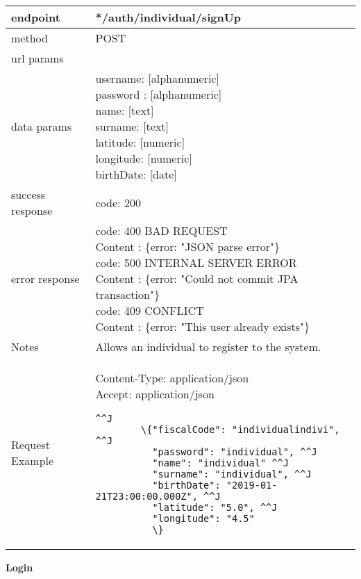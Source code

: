 \begin{tabularx}{\linewidth}{| l| l }
	\hline
	endpoint & */auth/individual/signUp \\
	\hline
	method & POST \\
	\hline
	url params & \\
	\hline
	data params &
	\parbox{0.7\textwidth}{
		\bigskip
		username: [alphanumeric]\\
		password : [alphanumeric]\\
		name: [text]\\
		surname: [text]\\
		latitude: [numeric]\\
		longitude: [numeric]\\
		birthDate: [date]
		\bigskip
	} \\
	\hline
	success response &
	\parbox{0.7\textwidth}{
		\bigskip
		code: 200\\
	} \\
	\hline
	error response &
	\parbox{0.7\textwidth}{
		\bigskip
		code: 400 BAD REQUEST \\
		Content : \{error: "JSON parse error"\}\\
		code: 500 INTERNAL SERVER ERROR \\
		Content : \{error: "Could not commit JPA transaction"\}\\
		code: 409 CONFLICT \\
		Content : \{error: "This user already exists"\}
		\bigskip
	} \\
	\hline
	Notes & 
	\parbox{0.7\textwidth}{
		\bigskip Allows an individual to register to the system.
	\bigskip}  \\
	\hline
	Request Example & 
		\parbox{0.8\textwidth}{
		\bigskip
		Content-Type: application/json \\
		Accept: application/json \\
		\bigskip
		\begin{lstlisting}^^J
		\{"fiscalCode": "individualindivi", ^^J
		  "password": "individual", ^^J
		  "name": "individual" ^^J
		  "surname": "individual", ^^J
		  "birthDate": "2019-01-21T23:00:00.000Z", ^^J
		  "latitude": "5.0", ^^J
		  "longitude": "4.5"
		  \}
		\end{lstlisting}
	} \\
	\hline
\end{tabularx}

\textbf{Login}\\


